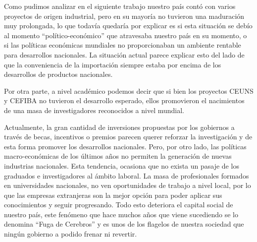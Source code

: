 \documentclass[%
 	final,
%
	notitlepage,
	narroweqnarray,
	inline,
 	twoside,
	]{ieee}
\begin{document}
Como pudimos analizar en el siguiente trabajo nuestro pa\'is cont\'o con varios proyectos de origen industrial, pero en su mayor\'ia no tuvieron una maduraci\'on muy prolongada, lo que todav\'ia quedar\'ia por explicar es si esta situaci\'on se deb\'io al momento ``pol\'itico-econ\'omico'' que atravesaba nuestro pa\'is en su momento, o si las pol\'iticas econ\'omicas mundiales no proporcionaban un ambiente rentable para desarrollos nacionales. La situaci\'on actual parece explicar esto del lado de que la conveniencia de la importaci\'on siempre estaba por encima de los desarrollos de productos nacionales.

Por otra parte, a nivel acad\'emico podemos decir que si bien los proyectos CEUNS y CEFIBA no tuvieron el desarrollo esperado, ellos promovieron el nacimientos de una masa de investigadores reconocidos a nivel mundial.

Actualmente, la gran cantidad de inversiones propuestas por los gobiernos a través de becas, incentivos o premios parecen querer reforzar la investigaci\'on y de esta forma promover los desarrollos nacionales. Pero, por otro lado, las pol\'iticas macro-econ\'omicas de los \'ultimos a\~nos no permiten la generaci\'on de nuevas industrias nacionales. Esta tendencia, ocasiona que no exista un pasaje de los graduados e investigadores al \'ambito laboral. La masa de profesionales formados en universidades nacionales, no ven oportunidades de trabajo a nivel local, por lo que las empresas extranjeras son la mejor opci\'on para poder aplicar sus conocimientos y seguir progresando. Todo esto deteriora el capital social de nuestro pa\'is, este fen\'omeno que hace muchos a\~nos que viene sucediendo se lo denomina ``Fuga de Cerebros'' y es unos de los flagelos de nuestra sociedad que ning\'un gobierno a podido frenar ni revertir.
\end{document}
